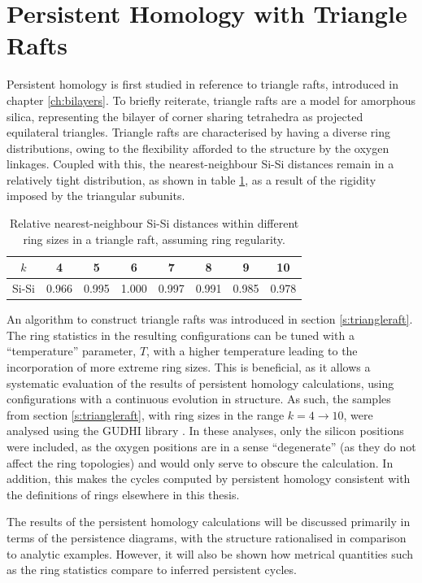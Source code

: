 \section{Persistent Homology with Triangle Rafts}

Persistent homology is first studied in reference to triangle rafts, introduced in chapter \ref{ch:bilayers}.
To briefly reiterate, triangle rafts are a model for \td{} amorphous silica, representing the bilayer of corner sharing tetrahedra as projected equilateral triangles.
Triangle rafts are characterised by having a diverse ring distributions, owing to the flexibility afforded to the structure by the oxygen linkages.
Coupled with this, the nearest\--neighbour Si\--Si distances remain in a relatively tight distribution, as shown in table \ref{tab:trsidist}, as a result of the rigidity imposed by the triangular subunits.

\begin{table}[hbt]
\centering
\caption{Relative nearest\--neighbour Si\--Si distances within different ring sizes in a triangle raft, assuming ring regularity.}
\label{tab:trsidist}
\begin{tabular}{cccccccc}
\toprule
$k$ & 4 & 5 & 6 & 7 & 8 & 9 & 10 \\
\midrule
Si\--Si & 0.966 & 0.995 & 1.000 & 0.997 & 0.991 & 0.985 & 0.978 \\
\bottomrule
\end{tabular}
\end{table}

An algorithm to construct triangle rafts was introduced in section \ref{s:triangleraft}.
The ring statistics in the resulting configurations can be tuned with a ``temperature'' parameter, $T$, with a higher temperature leading to the incorporation of more extreme ring sizes.
This is beneficial, as it allows a systematic evaluation of the results of persistent homology calculations, using configurations with a continuous evolution in structure.
As such, the samples from section \ref{s:triangleraft}, with ring sizes in the range $k=4\rightarrow10$, were analysed using the GUDHI library \cite{gudhi}.
In these analyses, only the silicon positions were included, as the oxygen positions are in a sense ``degenerate'' (as they do not affect the ring topologies) and would only serve to obscure the calculation.
In addition, this makes the cycles computed by persistent homology consistent with the definitions of rings elsewhere in this thesis.

The results of the persistent homology calculations will be discussed primarily in terms of the persistence diagrams, with the structure rationalised in comparison to analytic examples. 
However, it will also be shown how metrical quantities such as the ring statistics compare to inferred persistent cycles.

